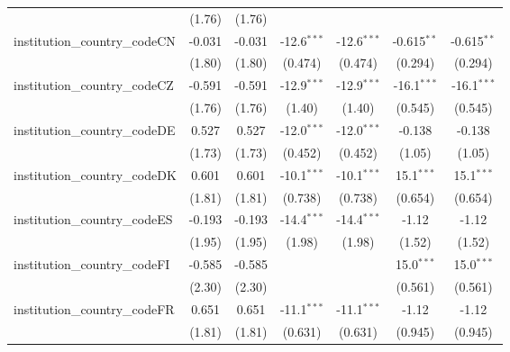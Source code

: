 \begin{tabular}{lcccccc}
                                         & (1.76)        & (1.76)        &               &               &               &   \\   
   institution\_country\_codeCN          & -0.031        & -0.031        & -12.6$^{***}$ & -12.6$^{***}$ & -0.615$^{**}$ & -0.615$^{**}$\\   
                                         & (1.80)        & (1.80)        & (0.474)       & (0.474)       & (0.294)       & (0.294)\\   
   institution\_country\_codeCZ          & -0.591        & -0.591        & -12.9$^{***}$ & -12.9$^{***}$ & -16.1$^{***}$ & -16.1$^{***}$\\   
                                         & (1.76)        & (1.76)        & (1.40)        & (1.40)        & (0.545)       & (0.545)\\   
   institution\_country\_codeDE          & 0.527         & 0.527         & -12.0$^{***}$ & -12.0$^{***}$ & -0.138        & -0.138\\   
                                         & (1.73)        & (1.73)        & (0.452)       & (0.452)       & (1.05)        & (1.05)\\   
   institution\_country\_codeDK          & 0.601         & 0.601         & -10.1$^{***}$ & -10.1$^{***}$ & 15.1$^{***}$  & 15.1$^{***}$\\   
                                         & (1.81)        & (1.81)        & (0.738)       & (0.738)       & (0.654)       & (0.654)\\   
   institution\_country\_codeES          & -0.193        & -0.193        & -14.4$^{***}$ & -14.4$^{***}$ & -1.12         & -1.12\\   
                                         & (1.95)        & (1.95)        & (1.98)        & (1.98)        & (1.52)        & (1.52)\\   
   institution\_country\_codeFI          & -0.585        & -0.585        &               &               & 15.0$^{***}$  & 15.0$^{***}$\\   
                                         & (2.30)        & (2.30)        &               &               & (0.561)       & (0.561)\\   
   institution\_country\_codeFR          & 0.651         & 0.651         & -11.1$^{***}$ & -11.1$^{***}$ & -1.12         & -1.12\\   
                                         & (1.81)        & (1.81)        & (0.631)       & (0.631)       & (0.945)       & (0.945)\\   

\end{tabular}

